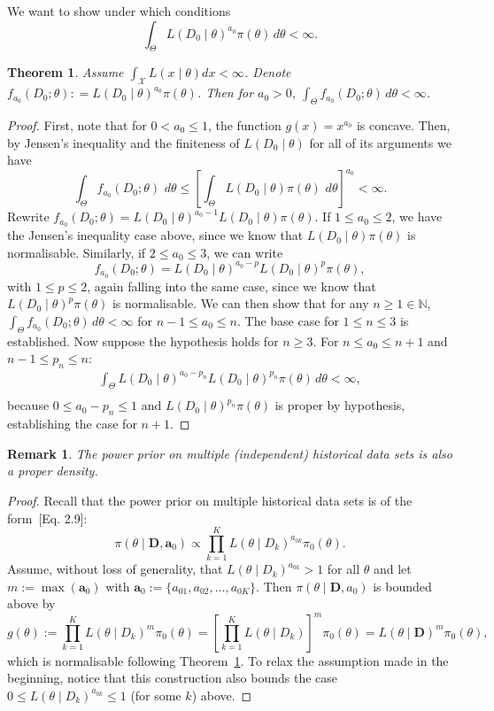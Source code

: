 \documentclass[a4paper, notitlepage, 11pt]{article}
\newtheorem{theorem}{Theorem}[]
\newtheorem{remark}{Remark}[]
\begin{document}
We want to show under which conditions
\[\int_{\Theta} L( D_0 \mid \theta)^{a_0}\pi(\theta) \, d\theta <\infty.\]
\begin{theorem}
\label{thm:integrability}
 Assume $\int_{\mathcal{X}} L( x \mid \theta)dx < \infty$.
 Denote $f_{a_0}(D_0;\theta) : = L( D_0 \mid \theta)^{a_0}\pi(\theta)$.
 Then for $a_0 > 0$, $\int_{\Theta} f_{a_0}(D_0;\theta) \, d\theta <\infty$.
\end{theorem}
\begin{proof}
First, note that for $0 < a_0 \leq 1$, the function $g(x) = x^{a_0}$ is concave.
Then, by Jensen's inequality and the finiteness of $L( D_0 \mid \theta)$ for all of its arguments we have
\[ \int_{\Theta} f_{a_0}(D_0; \theta) \, \, d\theta \leq \left[ \int_{\Theta} L(D_0  \mid \theta)\pi(\theta) \, \, d\theta \right]^{a_0} < \infty. \]
Rewrite $f_{a_0}(D_0; \theta) = L(D_0 \mid \theta)^{a_0 -1} L(D_0 \mid \theta)\pi(\theta)$.
If $1 \leq a_0 \leq 2$, we have the Jensen's inequality case above, since we know that $L(D_0 \mid \theta)\pi(\theta)$ is normalisable.
Similarly, if $2 \leq a_0 \leq 3$, we can write 
\[  f_{a_0}(D_0; \theta) = L(D_0 \mid \theta)^{a_0-p} L(D_0 \mid \theta)^p\pi(\theta), \]
with $1 \leq p \leq 2$, again falling into the same case, since we know that $L(D_0 \mid \theta)^{p}\pi(\theta)$ is normalisable.
We can then show that for any $n \geq 1 \in \mathbb{N}$, $\int_{\Theta}f_{a_0}( D_0 ; \theta)\, d\theta < \infty$ for  $n-1 \leq a_0 \leq n$.
The base case for $1 \leq n \leq 3$ is established.
Now suppose the hypothesis holds for $n \geq 3$.
For $ n \leq  a_0 \leq n + 1$ and $n-1 \leq p_n \leq n$:
\begin{align*}
 \int_{\Theta} L(D_0 \mid \theta)^{a_0-p_n} L(D_0 \mid \theta)^{p_n}\pi(\theta)\, d\theta < \infty, \\
\end{align*}
because $0 \leq a_0 - p_n \leq 1$ and $L(D_0 \mid \theta)^{p_n}\pi(\theta)$ is proper by hypothesis, establishing the case for $n + 1$.
\end{proof}
\begin{remark}
 The power prior on multiple (independent) historical data sets is also a proper density.
\end{remark}
\begin{proof}
 Recall that the power prior on multiple historical data sets is of the form~[Eq. 2.9]\citep{Ibrahim2015}:
 \[ \pi(\theta \mid \boldsymbol D, \boldsymbol a_0) \propto \prod_{k=1}^K L(\theta \mid D_k)^{a_{0k}} \pi_0(\theta). \]
Assume, without loss of generality, that $L(\theta \mid  D_k)^{a_{0k}} > 1$ for all $\theta$ and let $m := \max(\boldsymbol a_0)$ with $\boldsymbol a_0 := \{ a_{01}, a_{02}, \ldots, a_{0K}\}$.
Then $\pi(\theta \mid \boldsymbol D, a_0)$ is bounded above by 
\[  g(\theta) :=  \prod_{k=1}^K L(\theta \mid D_k)^{m} \pi_0(\theta) =  \left[ \prod_{k=1}^K L(\theta \mid D_k) \right]^m  \pi_0(\theta) = L(\theta \mid \boldsymbol D)^m \pi_0(\theta), \]
which is normalisable following Theorem~\ref{thm:integrability}.
To relax the assumption made in the beginning, notice that this construction also bounds the case $ 0 \leq  L(\theta \mid  D_k)^{a_{0k}} \leq 1$ (for some $k$) above.
\end{proof}
\end{document}
